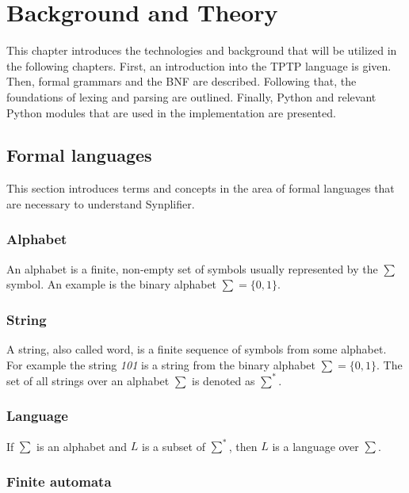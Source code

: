 
\chapter{Background and Theory}\label{cha:Background}

This chapter introduces the technologies and background that will be utilized in the following chapters. First, an introduction into the \ac{TPTP} language is given. Then, formal grammars and the \ac{BNF} are described. Following that, the foundations of lexing and parsing are outlined. Finally, Python and relevant Python modules that are used in the implementation are presented.

\section{Formal languages}\label{sec:BackgroundFormalLanguage}

This section introduces terms and concepts in the area of formal languages that are necessary to understand \ac{Synplifier}.

\subsection{Alphabet}
An alphabet is a finite, non-empty set of symbols usually represented by the $\sum$ symbol.
An example is the binary alphabet $\sum = \{0,1\}$. \cite{AutomataTheory.2007}

\subsection{String}
A string, also called word, is a finite sequence of symbols from some alphabet. For example the string \textit{101} is a string from the binary alphabet $\sum = \{0,1\}$.
The set of all strings over an alphabet $\sum$ is denoted as $\sum ^{*}$. \cite{AutomataTheory.2007}

\subsection{Language}
If $\sum$ is an alphabet and $L$ is a subset of $\sum ^*$, then $L$ is a language over $\sum$. \cite{AutomataTheory.2007}

\subsection{Finite automata}\label{sec:BackgroundAutomata}

